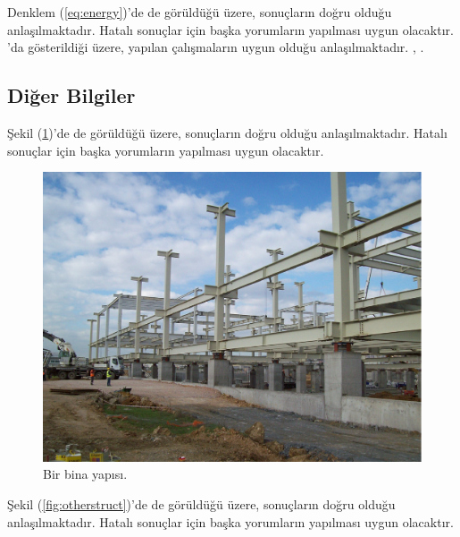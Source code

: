 \documentclass[turkish]{eqengconf}
\begin{document}
Denklem (\ref{eq:energy})'de de görüldüğü üzere, sonuçların doğru olduğu 
anlaşılmaktadır. Hatalı sonuçlar için başka yorumların yapılması uygun 
olacaktır. \textcite{Narasimhan2006, Erkus2006}'da gösterildiği üzere, yapılan 
çalışmaların uygun olduğu anlaşılmaktadır. \cite{Bekin2018-MSThesis}, 
\cite{Constantinou2011}.

\blindtext

\subsection{Diğer Bilgiler}
\blindtext

Şekil (\ref{fig:structure})'de de görüldüğü üzere, sonuçların doğru olduğu anlaşılmaktadır. Hatalı sonuçlar için başka yorumların yapılması uygun olacaktır.

\blindtext

\begin{figure}
	\vspace{-12pt}
	\centering
	\includegraphics[scale=0.2]{b.PNG}
	\caption{\label{fig:structure}Bir bina yapısı.}
	\vspace{-10pt}
\end{figure}

\blindtext

Şekil (\ref{fig:otherstruct})'de de görüldüğü üzere, sonuçların doğru olduğu anlaşılmaktadır. Hatalı sonuçlar için başka yorumların yapılması uygun olacaktır.
\end{document}
